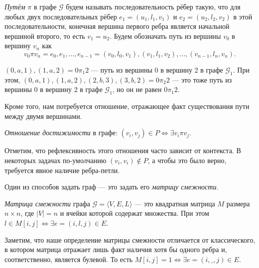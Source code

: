 \begin{definition}
  \textit{Путём} $\pi$ в графе $\mathcal{G}$ будем называть последовательность рёбер такую, что для любых двух последовательных рёбер $e_1=(u_1,l_1,v_1)$ и $e_2=(u_2,l_2,v_2)$ в этой последовательности, конечная вершина первого ребра является начальной вершиной второго, то есть $v_1 = u_2$. Будем обозначать путь из вершины $v_0$ в вершину $v_n$ как $$v_0 \pi v_n = e_0,e_1, \dots, e_{n-1} = (v_0, l_0, v_1),(v_1,l_1,v_2),\dots,(v_{n-1},l_n,v_n).$$

\begin{center}
  
\end{center}
\end{definition}

\begin{example}
$(0,a,1),(1,a,2) = 0\pi_1 2$  --- путь из вершины 0 в вершину 2 в графе $\mathcal{G}_1$.
При этом, $(0,a,1),(1,a,2),(2,b,3),(3,b,2) = 0\pi_2 2$ --- это тоже путь из вершины 0 в вершину 2 в графе $\mathcal{G}_1$, но он не равен $0\pi_1 2$.
\end{example}

Кроме того, нам потребуется отношение, отражающее факт существования пути между двумя вершинами.

\begin{definition}\label{def:reach}
  \textit{Отношение достижимости} в графе:
  $(v_i,v_j) \in P \iff \exists v_i \pi v_j$.
\end{definition}

Отметим, что рефлексивность этого отношения часто зависит от контекста.
В некоторых задачах по-умолчанию $(v_i,v_i) \notin P$, а чтобы это было верно, требуется явное наличие ребра-петли.

Один из способов задать граф --- это задать его \textit{матрицу смежности}.

\begin{definition}
  \textit{Матрица смежности} графа $\mathcal{G}=\langle V,E,L \rangle$ --- это квадратная матрица $M$ размера $n \times n$, где $|V| = n$ и ячейки которой содержат множества.
  При этом $l \in M[i,j] \iff \exists e = (i,l,j) \in E$.
\end{definition}

Заметим, что наше определение матрицы смежности отличается от классического, в котором матрица отражает лишь факт наличия хотя бы одного ребра и, соответственно, является булевой. То есть $M[i,j] = 1 \iff \exists e = (i,\_,j) \in E$.


